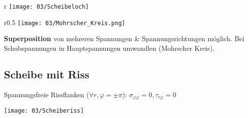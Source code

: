         \begin{wrapfigure}[0]{r}{\linewidth}
            \texttt{[image: 03/Scheibeloch]}
        \end{wrapfigure}
        \begin{wrapfigure}[6]{r}{0.5\linewidth}
            \vspace{-10mm}
            \texttt{[image: 03/Mohrscher\_Kreis.png]}
        \end{wrapfigure}
        \textbf{Superposition} von mehreren Spannungen \& Spannungsrichtungen möglich. Bei Schubspannungen in Hauptspannungen umwandlen (Mohrscher Kreis).
        \\
        
    \subsection{Scheibe mit Riss}
        Spannungsfreie Rissflanken ($\forall r, \varphi=\pm\pi$): $\sigma_{\varphi\varphi}=0, \tau_{r\varphi}=0$
        \begin{center}
            \texttt{[image: 03/Scheiberiss]}
        \end{center}